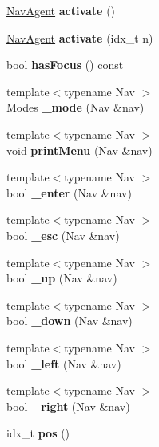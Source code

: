 \begin{DoxyCompactItemize}
\hyperlink{structNavAgent}{Nav\+Agent} {\bfseries activate} ()
\item 
\mbox{\label{classNavTree_a7af483c6aec85b4274360d8f92d5e836}} 
\hyperlink{structNavAgent}{Nav\+Agent} {\bfseries activate} (idx\+\_\+t n)
\item 
\mbox{\label{classNavTree_abc1d0a7abed8fb9af677f9daef621cf2}} 
bool {\bfseries has\+Focus} () const
\item 
\mbox{\label{classNavTree_a923a6e291404bbc936a862747881ceb4}} 
{\footnotesize template$<$typename Nav $>$ }\\Modes {\bfseries \+\_\+mode} (Nav \&nav)
\item 
\mbox{\label{classNavTree_aa14842fbd1afb94d92287607f64eed37}} 
{\footnotesize template$<$typename Nav $>$ }\\void {\bfseries print\+Menu} (Nav \&nav)
\item 
\mbox{\label{classNavTree_a59a335171d80f04cb186a3f7bb440c62}} 
{\footnotesize template$<$typename Nav $>$ }\\bool {\bfseries \+\_\+enter} (Nav \&nav)
\item 
\mbox{\label{classNavTree_a7ce107d01a9b9176e7175e4e0d4cac5a}} 
{\footnotesize template$<$typename Nav $>$ }\\bool {\bfseries \+\_\+esc} (Nav \&nav)
\item 
\mbox{\label{classNavTree_a8baf155bad85789b2647a84f2a562bc1}} 
{\footnotesize template$<$typename Nav $>$ }\\bool {\bfseries \+\_\+up} (Nav \&nav)
\item 
\mbox{\label{classNavTree_a4005e0838c582236fa630bfa6ca2f951}} 
{\footnotesize template$<$typename Nav $>$ }\\bool {\bfseries \+\_\+down} (Nav \&nav)
\item 
\mbox{\label{classNavTree_a445f28675d52987e79c9b756052d8847}} 
{\footnotesize template$<$typename Nav $>$ }\\bool {\bfseries \+\_\+left} (Nav \&nav)
\item 
\mbox{\label{classNavTree_a5528f862313134c883e14dfeff1e5560}} 
{\footnotesize template$<$typename Nav $>$ }\\bool {\bfseries \+\_\+right} (Nav \&nav)
\item 
\mbox{\label{classNavTree_ab00a434221b19a4351e946c4759d3e7e}} 
idx\+\_\+t {\bfseries pos} ()
\end{DoxyCompactItemize}
